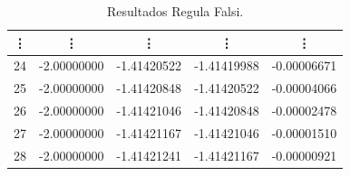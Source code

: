 \documentclass{beamer}
\begin{document}
\begin{frame}
{\begin{center}
\begin{table}[!ht]
\begin{center}
\begin{tabular}{|c||c||c||c||c|}
\vdots & \vdots & \vdots & \vdots & \vdots \\\hline
24 & -2.00000000 & -1.41420522 & -1.41419988 & -0.00006671 \\\hline
25 & -2.00000000 & -1.41420848 & -1.41420522 & -0.00004066 \\\hline
26 & -2.00000000 & -1.41421046 & -1.41420848 & -0.00002478 \\\hline
27 & -2.00000000 & -1.41421167 & -1.41421046 & -0.00001510 \\\hline
28 & -2.00000000 & -1.41421241 & -1.41421167 & -0.00000921 \\\hline
 \end{tabular}
 \caption{Resultados Regula Falsi.}\end{center}
 \label{tab_regfalsi}
\end{table}
  \end{center}}
\end{frame}
\end{document}

